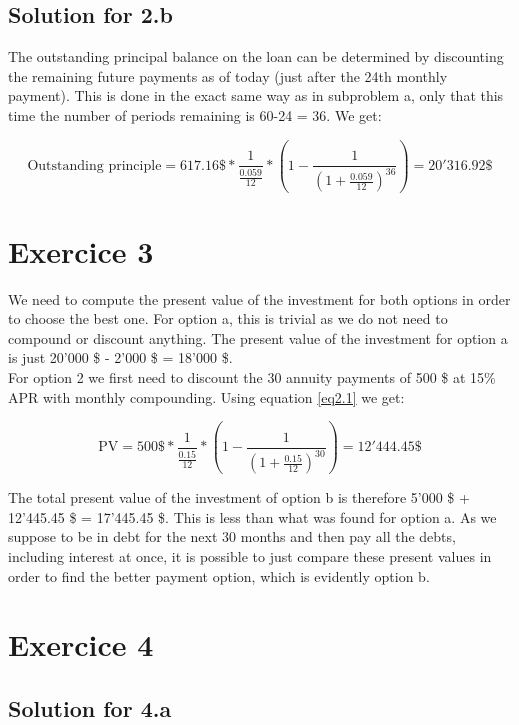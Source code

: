 \documentclass[a4paper,11pt,twoside]{article}
\begin{document}
\subsection{Solution for 2.b}

The outstanding principal balance on the loan can be determined by discounting the remaining future payments as of today (just after the 24th monthly payment). This is done in the exact same way as in subproblem a, only that this time the number of periods remaining is 60-24 = 36. We get:

\begin{equation}
\text{Outstanding principle} = 617.16\$*\frac{1}{\frac{0.059}{12}}*(1-\frac{1}{(1+\frac{0.059}{12})^{36}}) = 20'316.92\$
\end{equation}

\section{Exercice 3}

We need to compute the present value of the investment for both options in order to choose the best one. For option a, this is trivial as we do not need to compound or discount anything. The present value of the investment for option a is just 20'000 \$ - 2'000 \$ = 18'000 \$. \\
For option 2 we first need to discount the 30 annuity payments of 500 \$ at 15\% APR with monthly compounding. Using equation \ref{eq2.1} we get:

\begin{equation}
\text{PV} = 500\$*\frac{1}{\frac{0.15}{12}}*(1-\frac{1}{(1+\frac{0.15}{12})^{30}}) = 12'444.45\$
\end{equation}

The total present value of the investment of option b is therefore 5'000 \$ + 12'445.45 \$ = 17'445.45 \$. This is less than what was found for option a. As we suppose to be in debt for the next 30 months and then pay all the debts, including interest at once, it is possible to just compare these present values in order to find the better payment option, which is evidently option b.

\section{Exercice 4}

\subsection{Solution for 4.a}
\end{document}
